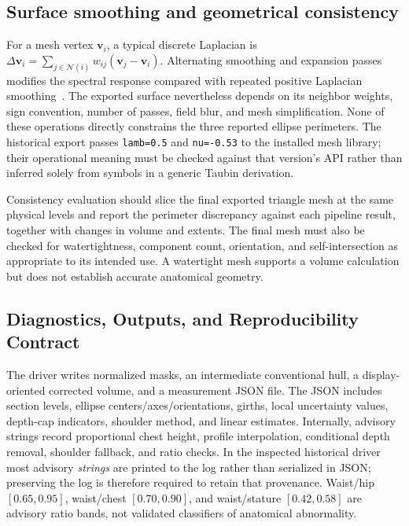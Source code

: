 \documentclass[11pt,a4paper]{article}
\numberwithin{equation}{section}
\begin{document}
\subsection{Surface smoothing and geometrical consistency}
For a mesh vertex $\mathbf v_i$, a typical discrete Laplacian is $\Delta\mathbf v_i=\sum_{j\in\mathcal N(i)}w_{ij}(\mathbf v_j-\mathbf v_i)$. Alternating smoothing and expansion passes modifies the spectral response compared with repeated positive Laplacian smoothing~\cite{taubin1995signal}. The exported surface nevertheless depends on its neighbor weights, sign convention, number of passes, field blur, and mesh simplification. None of these operations directly constrains the three reported ellipse perimeters. The historical export passes \texttt{lamb=0.5} and \texttt{nu=-0.53} to the installed mesh library; their operational meaning must be checked against that version's API rather than inferred solely from symbols in a generic Taubin derivation.

Consistency evaluation should slice the final exported triangle mesh at the same physical levels and report the perimeter discrepancy against each pipeline result, together with changes in volume and extents. The final mesh must also be checked for watertightness, component count, orientation, and self-intersection as appropriate to its intended use. A watertight mesh supports a volume calculation but does not establish accurate anatomical geometry.

\subsection{Diagnostics, Outputs, and Reproducibility Contract}
\label{subsec:reliability_flags}
The driver writes normalized masks, an intermediate conventional hull, a display-oriented corrected volume, and a measurement JSON file. The JSON includes section levels, ellipse centers/axes/orientations, girths, local uncertainty values, depth-cap indicators, shoulder method, and linear estimates. Internally, advisory strings record proportional chest height, profile interpolation, conditional depth removal, shoulder fallback, and ratio checks. In the inspected historical driver most advisory \emph{strings} are printed to the log rather than serialized in JSON; preserving the log is therefore required to retain that provenance. Waist/hip $[0.65,0.95]$, waist/chest $[0.70,0.90]$, and waist/stature $[0.42,0.58]$ are advisory ratio bands, not validated classifiers of anatomical abnormality.
\end{document}
